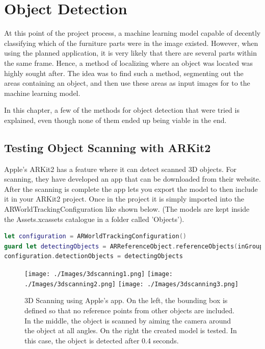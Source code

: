 \chapter{Object Detection}
At this point of the project process, a machine learning model capable of decently 
classifying which of the furniture parts were in the image existed. However, when using the 
planned application, it is very likely that there are several parts within the same frame. 
Hence, a method of localizing where an object was located was highly sought after. The idea 
was to find such a method, segmenting out the areas containing an object, and then use these  
areas as input images for to the machine learning model.

In this chapter, a few of the methods for object detection that were tried is explained, even though none of them ended up being viable in the end.
  
\section{Testing Object Scanning with ARKit2}
\label{sec:ODscanning}
Apple's ARKit2 has a feature where it can detect scanned 3D objects. For scanning, they have developed an app that can be downloaded from their website. \cite{ARScanning}
After the scanning is complete the app lets you export the model to then include it in your ARKit2 project. Once in the project it is simply imported into the ARWorldTrackingConfiguration like shown below. (The models are kept inside the Assets.xcassets catalogue in a folder called 'Objects').

\begin{lstlisting}[language=swift]
let configuration = ARWorldTrackingConfiguration()
guard let detectingObjects = ARReferenceObject.referenceObjects(inGroupNamed: "Objects", bundle: nil) else { return }
configuration.detectionObjects = detectingObjects
\end{lstlisting}

\begin{figure}[hbtp]
\begin{center}
\texttt{[image: ./Images/3dscanning1.png]}
\texttt{[image: ./Images/3dscanning2.png]}
\texttt{[image: ./Images/3dscanning3.png]} 
\caption{3D Scanning using Apple's app. On the left, the bounding box is defined so that no reference points from other objects are included. In the middle, the object is scanned by aiming the camera around the object at all angles. On the right the created model is tested. In this case, the object is detected after 0.4 seconds.}
\end{center}
\end{figure}

